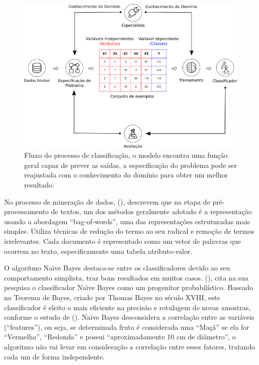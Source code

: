 \begin{figure}[H]
\begin{center}
    \includegraphics[scale=0.60]{images/processo_classificacao.png}
\end{center}
\caption{Fluxo do processo de classificação, o modelo encontra uma função geral 
capaz de prever as saídas, a especificação do problema pode ser reajustada com 
o conhecimento do domínio para obter um melhor resultado.}
\label{figure:processo_classificacao}
\end{figure}

No processo de mineração de dados,  
(\citeyear{matsubara2003pretext}), descrevem que na etapa de pré-processamento 
de textos, um dos métodos geralmente adotado é a representação usando a 
abordagem ``bag-of-words'', uma das representações estruturadas mais simples. 
Utiliza técnicas de redução do termo ao seu radical e remoção de termos 
irrelevantes. Cada documento é representado como um vetor de palavras que 
ocorrem no texto, especificamente uma tabela atributo-valor. 

O algoritmo Naive Bayes destaca-se entre os classificadores devido ao seu 
comportamento simplista, traz bons resultados em muitos casos. 
 (\citeyear{de2017mineraccao}), cita na sua 
pesquisa o classificador Naive Bayes como um progenitor probabilístico. Baseado 
no Teorema de Bayes, criado por Thomas Bayes no século XVIII, este 
classificador é eleito o mais eficiente na precisão e rotulagem de novas 
amostras, conforme o estudo de  
(\citeyear{chakrabarti2002mining}). Naive Bayes desconsidera a correlação entre 
as variáveis (``features''), ou seja, se determinada fruta é considerada uma 
``Maçã'' se ela for ``Vermelha'', ``Redonda'' e possui ``aproximadamente 10 cm 
de diâmetro'', o algoritmo não vai levar em consideração a correlação entre 
esses fatores, tratando cada um de forma independente.

